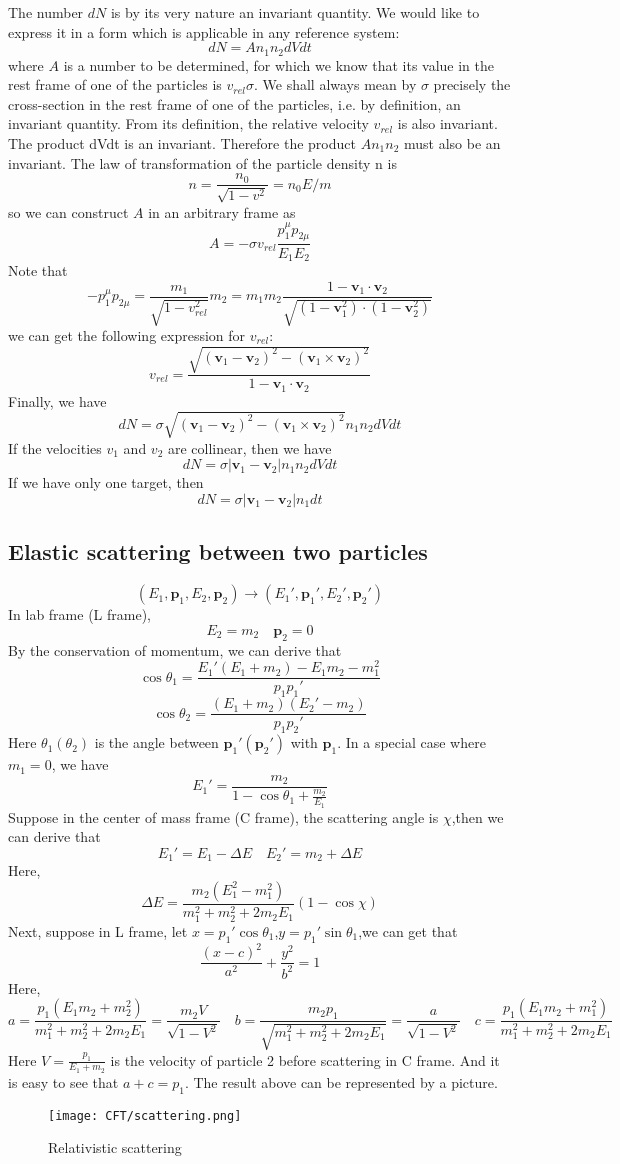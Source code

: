 \documentclass[cyan]{elegantnote}
\begin{document}
The number $dN$ is by its very nature an invariant quantity. We would like to express it in a form which is applicable in any reference system: 
\[dN = A n_1 n_2 dV dt\] 
where $A$ is a number to be determined, for which we know that its value in the rest frame of one of the particles is $v_{rel} \sigma$. We shall always mean by $\sigma$ precisely the cross-section in the rest frame of one of the particles, i.e. by definition, an invariant quantity. From its definition, the relative velocity $v_{rel}$ is also invariant. The product dVdt is an invariant. Therefore the product $A n_1 n_2$ must also be an invariant. The law of transformation of the particle density n is
\[n = \frac{n_0}{\sqrt{1-v^2}} = n_0 E/m\]
so we can construct $A$ in an arbitrary frame as
\[A = -\sigma v_{rel} \frac{p_1^{\mu}p_{2\mu}}{E_1 E_2}\]
Note that
\[-p_1^{\mu}p_{2\mu} = \frac{m_1}{\sqrt{1-v_{rel}^2}}m_2 = m_1 m_2 \frac{1-\bm{v}_1\cdot\bm{v}_2}{\sqrt{(1-\bm{v}_1^2)\cdot(1-\bm{v}_2^2)}}\]
we can get the following expression for $v_{rel}$:
\[v_{rel} = \frac{\sqrt{(\bm{v}_1-\bm{v}_2)^2-(\bm{v}_1\times\bm{v}_2)^2}}{1-\bm{v}_1\cdot\bm{v}_2}\]
Finally, we have
\[dN = \sigma \sqrt{(\bm{v}_1-\bm{v}_2)^2-(\bm{v}_1\times\bm{v}_2)^2} n_1 n_2 dV dt\]
If the velocities $v_1$ and $v_2$ are collinear, then we have
\[dN = \sigma |\bm{v}_1 - \bm{v}_2| n_1 n_2 dV dt\]
If we have only one target, then
\[dN = \sigma |\bm{v}_1 - \bm{v}_2| n_1 dt\]

\subsection{Elastic scattering between two particles}
\[(E_1,\bm{p}_1,E_2,\bm{p}_2) \to (E_1',\bm{p}_1',E_2',\bm{p}_2')\]
In lab frame (L frame),
\[E_2 = m_2 \quad \bm{p}_2 = 0\]
By the conservation of momentum, we can derive that
\[\cos \theta_1 = \frac{E_1'(E_1+m_2)-E_1 m_2 - m_1^2}{p_1 p_1'}\]
\[\cos \theta_2 = \frac{(E_1+m_2)(E_2'-m_2)}{p_1 p_2'}\]
Here $\theta_1(\theta_2)$ is the angle between $\bm{p}_1'(\bm{p}_2')$ with $\bm{p}_1$.
In a special case where $m_1 =0$, we have
\[E_1' = \frac{m_2}{1-\cos\theta_1 + \frac{m_2}{E_1}}\]
Suppose in the center of mass frame (C frame), the scattering angle is $\chi$,then we can derive that
\[E_1' = E_1 - \Delta E \quad E_2' = m_2 + \Delta E\]
Here,
\[\Delta E = \frac{m_2(E_1^2-m_1^2)}{m_1^2 + m_2^2 + 2m_2E_1}(1-\cos\chi)\]
Next, suppose in L frame, let $x = p_1'\cos\theta_1$,$y = p_1'\sin\theta_1$,we can get that
\[\frac{(x-c)^2}{a^2}+\frac{y^2}{b^2}=1\]
Here,
\[a = \frac{p_1(E_1m_2+m_2^2)}{m_1^2 + m_2^2 + 2m_2 E_1} = \frac{m_2V}{\sqrt{1-V^2}} \quad b = \frac{m_2 p_1}{\sqrt{m_1^2 + m_2^2 + 2m_2 E_1}} = \frac{a}{\sqrt{1-V^2}} \quad c = \frac{ p_1(E_1m_2+m_1^2)}{m_1^2 + m_2^2 + 2m_2 E_1}\]
Here $V = \frac{p_1}{E_1 + m_2}$ is the velocity of particle 2 before scattering in C frame. And it is easy to see that $a + c = p_1$. The result above can be represented by a picture.
\begin{figure}[!h]
\centering
\texttt{[image: CFT/scattering.png]}
\caption{Relativistic scattering}
\end{figure}
\end{document}
